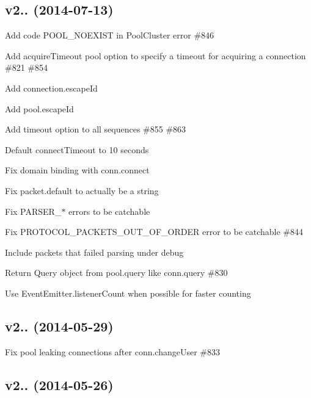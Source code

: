 \subsection*{v2.. (2014-\/07-\/13)}


\begin{DoxyItemize}
\item Add code {\ttfamily P\+O\+O\+L\+\_\+\+N\+O\+E\+X\+I\+S\+T} in Pool\+Cluster error \#846
\item Add {\ttfamily acquire\+Timeout} pool option to specify a timeout for acquiring a connection \#821 \#854
\item Add {\ttfamily connection.\+escape\+Id}
\item Add {\ttfamily pool.\+escape\+Id}
\item Add {\ttfamily timeout} option to all sequences \#855 \#863
\item Default {\ttfamily connect\+Timeout} to 10 seconds
\item Fix domain binding with {\ttfamily conn.\+connect}
\item Fix {\ttfamily packet.\+default} to actually be a string
\item Fix {\ttfamily P\+A\+R\+S\+E\+R\+\_\+$\ast$} errors to be catchable
\item Fix {\ttfamily P\+R\+O\+T\+O\+C\+O\+L\+\_\+\+P\+A\+C\+K\+E\+T\+S\+\_\+\+O\+U\+T\+\_\+\+O\+F\+\_\+\+O\+R\+D\+E\+R} error to be catchable \#844
\item Include packets that failed parsing under {\ttfamily debug}
\item Return {\ttfamily Query} object from {\ttfamily pool.\+query} like {\ttfamily conn.\+query} \#830
\item Use {\ttfamily Event\+Emitter.\+listener\+Count} when possible for faster counting
\end{DoxyItemize}

\subsection*{v2.. (2014-\/05-\/29)}


\begin{DoxyItemize}
\item Fix pool leaking connections after {\ttfamily conn.\+change\+User} \#833
\end{DoxyItemize}

\subsection*{v2.. (2014-\/05-\/26)}


